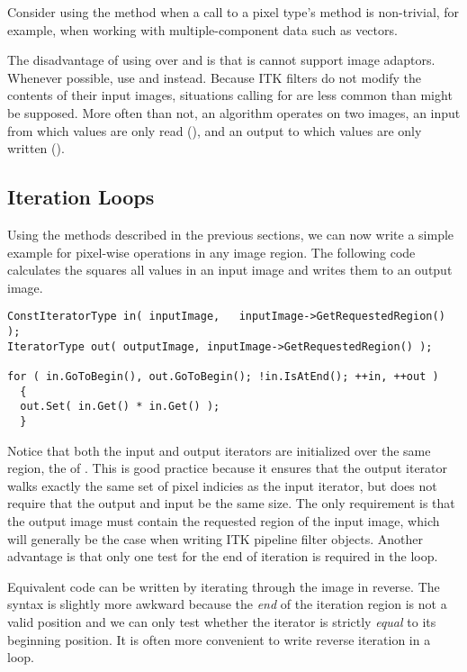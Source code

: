 Consider using the  method when a call to a pixel type's
 method is non-trivial, for example, when working
with multiple-component data such as vectors.

The disadvantage of using  over  and  is
that is cannot support image adaptors. Whenever possible, use  and
 instead.  Because ITK filters do not modify the contents of their
input images, situations calling for  are less common than might
be supposed.  More often than not, an algorithm operates on two images, an
input from which values are only read (), and an output to which
values are only written ().


\subsection{Iteration Loops}
\label{sec:IterationExample}
Using the methods described in the previous sections, we can now write a simple
example for pixel-wise operations in any image region.  The following code
calculates the squares all values in an input image and writes them to an
output image.

\small
\begin{verbatim}
ConstIteratorType in( inputImage,   inputImage->GetRequestedRegion() );
IteratorType out( outputImage, inputImage->GetRequestedRegion() );

for ( in.GoToBegin(), out.GoToBegin(); !in.IsAtEnd(); ++in, ++out )
  {
  out.Set( in.Get() * in.Get() );
  }
\end{verbatim}
\normalsize

Notice that both the input and output iterators are initialized over the same
region, the  of .  This is good
practice because it ensures that the output iterator walks exactly the same set
of pixel indicies as the input iterator, but does not require that the output
and input be the same size.  The only requirement is that the output image must
contain the requested region of the input image, which will generally be
the case when writing ITK pipeline filter objects.  Another advantage is that
only one test for the end of iteration is required in the  loop.

Equivalent code can be written by iterating through the image in reverse.
The syntax is slightly more awkward because the \emph{end} of the
iteration region is not a valid position and we can only test whether the
iterator is strictly \emph{equal} to its beginning position.  It is often more
convenient to write reverse iteration in a
 loop.

